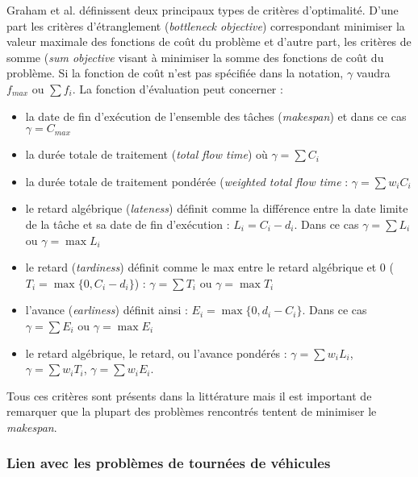 Graham et al. définissent deux principaux types de critères d'optimalité. D'une part les critères d'étranglement (\textit{bottleneck objective}) correspondant minimiser la valeur maximale des fonctions de coût du problème et d'autre part, les critères de somme (\textit{sum objective} visant à minimiser la somme des fonctions de coût du problème. Si la fonction de coût n'est pas spécifiée dans la notation, $\gamma$ vaudra $f_{max}$ ou $\sum f_i$.
La fonction d'évaluation peut concerner :
\begin{itemize}
 \item la date de fin d'exécution de l'ensemble des tâches (\textit{makespan}) et dans ce cas $\gamma = C_{max}$
 \item la durée totale de traitement (\textit{total flow time}) où $\gamma = \sum C_i$
 \item la durée totale de traitement pondérée (\textit{weighted total flow time} : $\gamma = \sum w_i C_i$
 \item le retard algébrique (\textit{lateness}) définit comme la différence entre la date limite de la tâche et sa date de fin d'exécution : $L_i = C_i - d_i$. Dans ce cas $\gamma = \sum L_i$ ou $\gamma = \max L_i$
 \item le retard (\textit{tardiness}) définit comme le max entre le retard algébrique et 0 ($T_i = \max \{0, C_i - d_i\}$) : $\gamma = \sum T_i$ ou $\gamma = \max T_i$
 \item l'avance (\textit{earliness}) définit ainsi : $E_i = \max \{0, d_i - C_i\}$. Dans ce cas $\gamma = \sum E_i$ ou $\gamma = \max E_i$
 \item le retard algébrique, le retard, ou l'avance pondérés : $\gamma = \sum w_i L_i$, $\gamma = \sum w_i T_i$, $\gamma = \sum w_i E_i$.
\end{itemize}

Tous ces critères sont présents dans la littérature mais il est important de remarquer que la plupart des problèmes rencontrés tentent de minimiser le \textit{makespan}.

\subsubsection{Lien avec les problèmes de tournées de véhicules}

